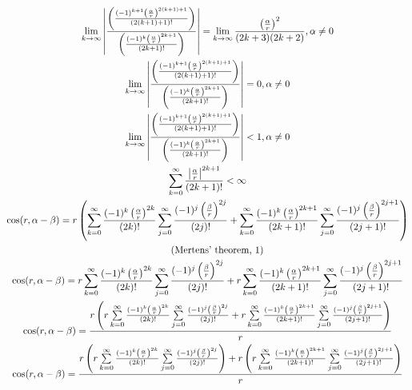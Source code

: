 \documentclass[a4paper,12pt]{report}
\newcommand{\equationnote}[1]{%
    \refstepcounter{equation}%
    \tag{#1, \theequation}%
}
\begin{document}
\begin{landscape}
{\begin{gather}
\lim \limits_{k \to \infty} \left|\frac{\left(\frac{(-1)^{k+1} \left(\frac{\alpha}{r}\right)^{2(k+1)+1}}{(2(k+1)+1)!}\right)}{\left(\frac{(-1)^k \left(\frac{\alpha}{r}\right)^{2k+1}}{(2k+1)!}\right)}\right| = \lim \limits_{k \to \infty} \frac{\left(\frac{\alpha}{r}\right)^2}{(2k+3)(2k+2)}, \alpha \neq 0 \\
\lim \limits_{k \to \infty} \left|\frac{\left(\frac{(-1)^{k+1} \left(\frac{\alpha}{r}\right)^{2(k+1)+1}}{(2(k+1)+1)!}\right)}{\left(\frac{(-1)^k \left(\frac{\alpha}{r}\right)^{2k+1}}{(2k+1)!}\right)}\right| = 0, \alpha \neq 0 \\
\lim \limits_{k \to \infty} \left|\frac{\left(\frac{(-1)^{k+1} \left(\frac{\alpha}{r}\right)^{2(k+1)+1}}{(2(k+1)+1)!}\right)}{\left(\frac{(-1)^k \left(\frac{\alpha}{r}\right)^{2k+1}}{(2k+1)!}\right)}\right| < 1, \alpha \neq 0 \\
\sum \limits_{k=0}^{\infty} \frac{\left|\frac{\alpha}{r}\right|^{2k+1}}{(2k+1)!} < \infty \\
\cos(r,\alpha - \beta) = r \left(\sum \limits_{k=0}^{\infty} \frac{(-1)^k \left(\frac{\alpha}{r}\right)^{2k}}{(2k)!} \sum \limits_{j=0}^{\infty} \frac{(-1)^j \left(\frac{\beta}{r}\right)^{2j}}{(2j)!} + \sum \limits_{k=0}^{\infty} \frac{(-1)^k \left(\frac{\alpha}{r}\right)^{2k+1}}{(2k+1)!} \sum \limits_{j=0}^{\infty} \frac{(-1)^j \left(\frac{\beta}{r}\right)^{2j+1}}{(2j+1)!}\right) \notag \\
\equationnote{Mertens' theorem} \\
\cos(r,\alpha - \beta) = r \sum \limits_{k=0}^{\infty} \frac{(-1)^k \left(\frac{\alpha}{r}\right)^{2k}}{(2k)!} \sum \limits_{j=0}^{\infty} \frac{(-1)^j \left(\frac{\beta}{r}\right)^{2j}}{(2j)!} + r \sum \limits_{k=0}^{\infty} \frac{(-1)^k \left(\frac{\alpha}{r}\right)^{2k+1}}{(2k+1)!} \sum \limits_{j=0}^{\infty} \frac{(-1)^j \left(\frac{\beta}{r}\right)^{2j+1}}{(2j+1)!} \\
\cos(r,\alpha - \beta) = \frac{r \left(r \sum \limits_{k=0}^{\infty} \frac{(-1)^k \left(\frac{\alpha}{r}\right)^{2k}}{(2k)!} \sum \limits_{j=0}^{\infty} \frac{(-1)^j \left(\frac{\beta}{r}\right)^{2j}}{(2j)!} + r \sum \limits_{k=0}^{\infty} \frac{(-1)^k \left(\frac{\alpha}{r}\right)^{2k+1}}{(2k+1)!} \sum \limits_{j=0}^{\infty} \frac{(-1)^j \left(\frac{\beta}{r}\right)^{2j+1}}{(2j+1)!}\right)}{r} \\
\cos(r,\alpha - \beta) = \frac{r \left(r \sum \limits_{k=0}^{\infty} \frac{(-1)^k \left(\frac{\alpha}{r}\right)^{2k}}{(2k)!} \sum \limits_{j=0}^{\infty} \frac{(-1)^j \left(\frac{\beta}{r}\right)^{2j}}{(2j)!}\right) + r \left(r \sum \limits_{k=0}^{\infty} \frac{(-1)^k \left(\frac{\alpha}{r}\right)^{2k+1}}{(2k+1)!} \sum \limits_{j=0}^{\infty} \frac{(-1)^j \left(\frac{\beta}{r}\right)^{2j+1}}{(2j+1)!}\right)}{r} \\

\end{gather}}
\end{landscape}
\end{document}
